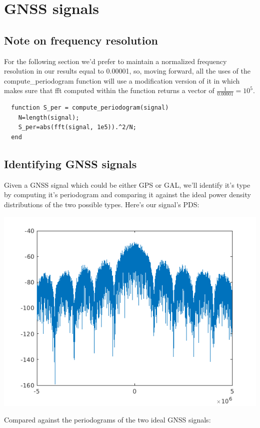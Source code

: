 \documentclass[conference,9pt]{IEEEtran}
\begin{document}
\section{GNSS signals}
\subsection{Note on frequency resolution}
For the following section we'd prefer to maintain a normalized frequency resolution in our results equal to 0.00001, so, moving forward, all the uses of the compute\_periodogram function will use a modification version of it in which makes sure that fft computed within the function returns a vector of $\frac{1}{0.00001}=10^5$.

\begin{verbatim}
  function S_per = compute_periodogram(signal)
    N=length(signal);
    S_per=abs(fft(signal, 1e5)).^2/N;
  end
\end{verbatim}

\subsection{Identifying GNSS signals}
Given a GNSS signal which could be either GPS or GAL, we'll identify it's type by computing it's periodogram and comparing it against the ideal power density distributions of the two possible types. Here's our signal's PDS:

\includegraphics[scale=0.5]{b1}

Compared against the periodograms of the two ideal GNSS signals:
\end{document}
